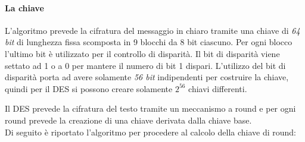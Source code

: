 \documentclass[11pt, a4paper, oneside]{Thesis} %
\begin{document}
\paragraph{La chiave}L'algoritmo prevede la cifratura del messaggio in chiaro tramite una chiave di \textit{64 bit} di lunghezza fissa scomposta in 9 blocchi da 8 bit ciascuno.
Per ogni blocco l'ultimo bit è utilizzato per il controllo di disparità. Il bit di disparità viene settato ad 1 o a 0 per mantere il numero di bit 1 dispari.
L'utilizzo del bit di disparità porta ad avere solamente \textit{56 bit} indipendenti per costruire la chiave, quindi per il DES si possono creare solamente $2^{56}$ chiavi differenti.
\par Il DES prevede la cifratura del testo tramite un meccanismo a round e per ogni round prevede la creazione di una chiave derivata dalla chiave base.
\\Di seguito è riportato l'algoritmo per procedere al calcolo della chiave di round:
\end{document}
